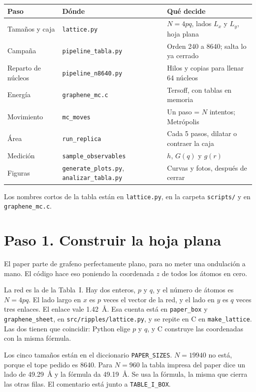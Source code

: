\documentclass[11pt,a4paper]{article}
\newcommand{\fn}[1]{\texttt{#1}}
\begin{document}
\begin{center}
\small
\begin{tabular}{@{}>{\raggedright\arraybackslash}p{3.4cm}>{\raggedright\arraybackslash}p{3.8cm}>{\raggedright\arraybackslash}p{6.3cm}@{}}
\toprule
Paso & Dónde & Qué decide \\
\midrule
Tamaños y caja & \fn{lattice.py} & $N=4pq$, lados $L_x$ y $L_y$, hoja plana \\
Campaña & \fn{pipeline\_tabla.py} & Orden 240 a 8640; salta lo ya cerrado \\
Reparto de núcleos & \fn{pipeline\_n8640.py} & Hilos y copias para llenar 64 núcleos \\
Energía & \fn{graphene\_mc.c} & Tersoff, con tablas en memoria \\
Movimiento & \fn{mc\_moves} & Un paso = $N$ intentos; Metrópolis \\
Área & \fn{run\_replica} & Cada 5 pasos, dilatar o contraer la caja \\
Medición & \fn{sample\_observables} & $h$, $G(q)$ y $g(r)$ \\
Figuras & \fn{generate\_plots.py}, \fn{analizar\_tabla.py} & Curvas y fotos, después de cerrar \\
\bottomrule
\end{tabular}
\end{center}

\noindent Los nombres cortos de la tabla están en \fn{lattice.py}, en la carpeta \fn{scripts/} y en \fn{graphene\_mc.c}.

\section{Paso 1. Construir la hoja plana}

El paper parte de grafeno perfectamente plano, para no meter una ondulación a mano. El código hace eso poniendo la coordenada $z$ de todos los átomos en cero.

La red es la de la Tabla~I. Hay dos enteros, $p$ y $q$, y el número de átomos es $N=4pq$. El lado largo en $x$ es $p$ veces el vector de la red, y el lado en $y$ es $q$ veces tres enlaces. El enlace vale 1.42~Å. Esa cuenta está en \fn{paper\_box} y \fn{graphene\_sheet}, en \fn{src/ripples/lattice.py}, y se repite en C en \fn{make\_lattice}. Las dos tienen que coincidir: Python elige $p$ y $q$, y C construye las coordenadas con la misma fórmula.

Los cinco tamaños están en el diccionario \fn{PAPER\_SIZES}. $N=19940$ no está, porque el tope pedido es 8640. Para $N=960$ la tabla impresa del paper dice un lado de 49.29~Å y la fórmula da 49.19~Å. Se usa la fórmula, la misma que cierra las otras filas. El comentario está junto a \fn{TABLE\_I\_BOX}.
\end{document}
